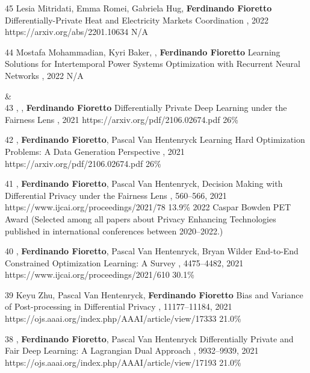 \begin{pubs}
	\confentry
	{45} %
	{Lesia Mitridati, Emma Romei, Gabriela Hug, {\bf Ferdinando Fioretto}}
	{Differentially-Private Heat and Electricity Markets Coordination}
	{\procPMAPS, 2022}
	{https://arxiv.org/abs/2201.10634}
	{N/A}
 
	\confentry
	{44} %
	{Mostafa Mohammadian, Kyri Baker, , {\bf Ferdinando Fioretto}}
	{Learning Solutions for Intertemporal Power Systems Optimization with Recurrent Neural Networks}
	{\procPMAPS, 2022}
	{N/A}


{}&\nemph{\rule{0.5\linewidth}{0.5pt}}\\[1em]

	\confentry 
	{43} %
	{, , {\bf Ferdinando Fioretto}}
	{Differentially Private Deep Learning under the Fairness Lens}
	{\procNeurIPS, 2021}
	{https://arxiv.org/pdf/2106.02674.pdf}
	{26\%} %

	\confentry 
	{42} %
	{, {\bf Ferdinando Fioretto}, Pascal Van Hentenryck}
	{Learning Hard Optimization Problems: A Data Generation Perspective}
	{\procNeurIPS, 2021}
	{https://arxiv.org/pdf/2106.02674.pdf}
	{26\%} %

	\confentryAwd 
	{41} %
	{, {\bf Ferdinando Fioretto}, Pascal Van Hentenryck, }
	{Decision Making with Differential Privacy under the Fairness Lens}
	{\procIJCAI, 560--566, 2021}
	{https://www.ijcai.org/proceedings/2021/78}
	{13.9\%} %
	{2022 Caspar Bowden PET Award}
	{(Selected among all papers about Privacy Enhancing Technologies published in international conferences between 2020--2022.)}

	\confentry 
	{40} %
	{, {\bf Ferdinando Fioretto}, Pascal Van Hentenryck, Bryan Wilder}
	{End-to-End Constrained Optimization Learning: A Survey}
	{\procIJCAI, 4475--4482, 2021}
	{https://www.ijcai.org/proceedings/2021/610}
	{30.1\%}

	\confentry 
	{39} %
	{Keyu Zhu, Pascal Van Hentenryck, {\bf Ferdinando Fioretto}}
	{Bias and Variance of Post-processing in Differential Privacy}
	{\procAAAI, 11177--11184, 2021}
	{https://ojs.aaai.org/index.php/AAAI/article/view/17333}
    {21.0\%} %

	\confentry 
	{38} %
	{, {\bf Ferdinando Fioretto}, Pascal Van Hentenryck}
	{Differentially Private and Fair Deep Learning: A Lagrangian Dual Approach}
	{\procAAAI, 9932--9939, 2021}
	{https://ojs.aaai.org/index.php/AAAI/article/view/17193}
    {21.0\%} %


\end{pubs}
